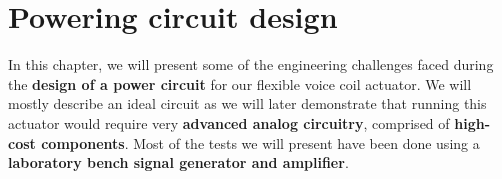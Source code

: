 
\chapter{Powering circuit design} %
\label{Chapter4}
In this chapter, we will present some of the engineering challenges faced during the \textbf{design of a power circuit} for our flexible voice coil actuator.
We will mostly describe an ideal circuit as we will later demonstrate that running this actuator would require very \textbf{advanced analog circuitry}, comprised of \textbf{high-cost components}.
Most of the tests we will present have been done using a \textbf{laboratory bench signal generator and amplifier}.










% 

% 
